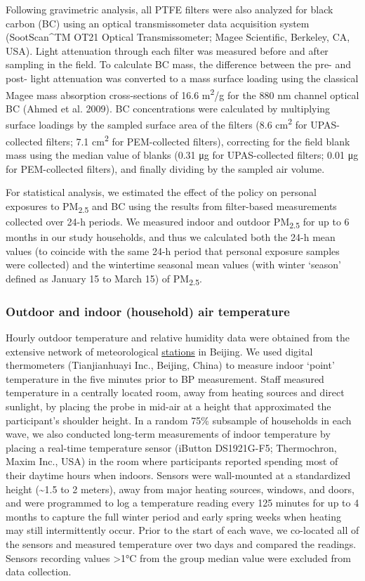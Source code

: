 \documentclass[
  letterpaper,
  DIV=11,
  numbers=noendperiod]{scrartcl}
\begin{document}
Following gravimetric analysis, all PTFE filters were also analyzed for
black carbon (BC) using an optical transmissometer data acquisition
system (SootScan\^{}TM OT21 Optical Transmissometer; Magee Scientific,
Berkeley, CA, USA). Light attenuation through each filter was measured
before and after sampling in the field. To calculate BC mass, the
difference between the pre- and post- light attenuation was converted to
a mass surface loading using the classical Magee mass absorption
cross-sections of 16.6 m\textsuperscript{2}/g for the 880 nm channel
optical BC (Ahmed et al. 2009). BC concentrations were calculated by
multiplying surface loadings by the sampled surface area of the filters
(8.6 cm\textsuperscript{2} for UPAS-collected filters; 7.1
cm\textsuperscript{2} for PEM-collected filters), correcting for the
field blank mass using the median value of blanks (0.31 μg for
UPAS-collected filters; 0.01 μg for PEM-collected filters), and finally
dividing by the sampled air volume.

For statistical analysis, we estimated the effect of the policy on
personal exposures to PM\textsubscript{2.5} and BC using the results
from filter-based measurements collected over 24-h periods. We measured
indoor and outdoor PM\textsubscript{2.5} for up to 6 months in our study
households, and thus we calculated both the 24-h mean values (to
coincide with the same 24-h period that personal exposure samples were
collected) and the wintertime seasonal mean values (with winter `season'
defined as January 15 to March 15) of PM\textsubscript{2.5}.

\subsubsection{Outdoor and indoor (household) air
temperature}\label{outdoor-and-indoor-household-air-temperature}

Hourly outdoor temperature and relative humidity data were obtained from
the extensive network of meteorological
\href{http://beijingair.sinaapp.com}{stations} in Beijing. We used
digital thermometers (Tianjianhuayi Inc., Beijing, China) to measure
indoor `point' temperature in the five minutes prior to BP measurement.
Staff measured temperature in a centrally located room, away from
heating sources and direct sunlight, by placing the probe in mid-air at
a height that approximated the participant's shoulder height. In a
random 75\% subsample of households in each wave, we also conducted
long-term measurements of indoor temperature by placing a real-time
temperature sensor (iButton DS1921G-F5; Thermochron, Maxim Inc., USA) in
the room where participants reported spending most of their daytime
hours when indoors. Sensors were wall-mounted at a standardized height
(\textasciitilde1.5 to 2 meters), away from major heating sources,
windows, and doors, and were programmed to log a temperature reading
every 125 minutes for up to 4 months to capture the full winter period
and early spring weeks when heating may still intermittently occur.
Prior to the start of each wave, we co-located all of the sensors and
measured temperature over two days and compared the readings. Sensors
recording values \textgreater1°C from the group median value were
excluded from data collection.
\end{document}
